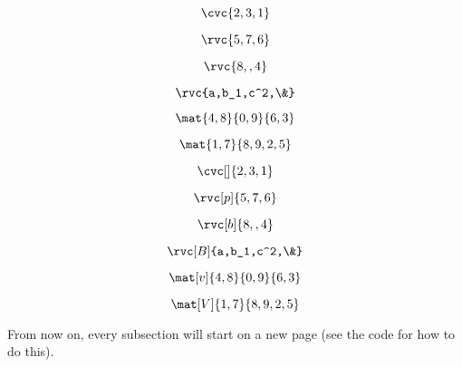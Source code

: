 \vspace{5pt}

\begin{multicols}{2}
\begin{verbbox}
$$\cvc{2,3,1}$$
\end{verbbox}

\begin{verbbox}
$$\rvc{5,7,6}$$
\end{verbbox}

\begin{verbbox}
$$\rvc{8,,4}$$
\end{verbbox}

\begin{verbbox}
$$\rvc{a,b_1,c^2,\&}$$
\end{verbbox}

\begin{verbbox}
$$\mat{4,8}{0,9}{6,3}$$
\end{verbbox}

\begin{verbbox}
$$\mat{1,7}{8,9,2,5}$$
\end{verbbox}
\begin{verbbox}
$$\cvc[]{2,3,1}$$
\end{verbbox}

\begin{verbbox}
$$\rvc[p]{5,7,6}$$
\end{verbbox}

\begin{verbbox}
$$\rvc[b]{8,,4}$$
\end{verbbox}

\begin{verbbox}
$$\rvc[B]{a,b_1,c^2,\&}$$
\end{verbbox}

\begin{verbbox}
$$\mat[v]{4,8}{0,9}{6,3}$$
\end{verbbox}

\begin{verbbox}
$$\mat[V]{1,7}{8,9,2,5}$$
\end{verbbox}
\end{multicols}

\vspace{15pt}

{\sffamily From now on, every subsection will start on a new page (see the code for how to do this).}

\newcommand{\subsectionbreak}{\clearpage} %

